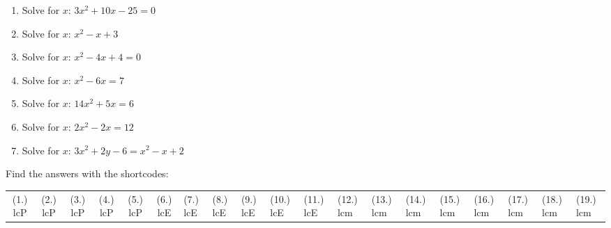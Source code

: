 \begin{enumerate}[noitemsep, label=\textbf{\arabic*}. ]
\label{m39247*uid57}\item Solve for $x$: $3{x}^{2}+10x-25=0$\hspace{1ex}        
\label{m39247*uid58}\item Solve for $x$: ${x}^{2}-x+3$\hspace{1ex}\hspace{1ex}        
\label{m39247*uid59}\item Solve for $x$: ${x}^{2}-4x+4=0$\hspace{1ex}        \label{m39247*uid60}\item Solve for $x$: ${x}^{2}-6x=7$\hspace{1ex}        
\label{m39247*uid61}\item Solve for $x$: $14{x}^{2}+5x=6$\hspace{1ex}        
\label{m39247*uid62}\item Solve for $x$: $2{x}^{2}-2x=12$\hspace{1ex}        
\label{m39247*uid63}\item Solve for $x$: $3{x}^{2}+2y-6={x}^{2}-x+2$\hspace{1ex}        
\end{enumerate}
\label{m39247**end}
\par {} Find the answers with the shortcodes:
 \par \begin{tabular}[h]{cccccc}
 (1.) lcP  &  (2.) lcP  &  (3.) lcP  &  (4.) lcP  &  (5.) lcP  &  (6.) lcE  &  (7.) lcE  &  (8.) lcE  &  (9.) lcE  &  (10.) lcE  &  (11.) lcE  &  (12.) lcm  &  (13.) lcm  &  (14.) lcm  &  (15.) lcm  &  (16.) lcm  &  (17.) lcm  &  (18.) lcm  &  (19.) lcm  & \end{tabular}
%     
%     
